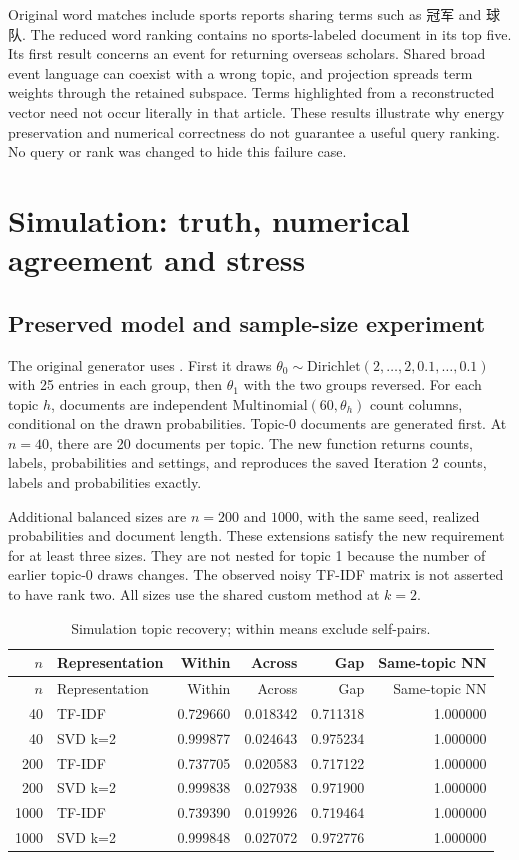 \documentclass[11pt]{article}
\renewcommand{\arraystretch}{1.15}
\begin{document}
Original word matches include sports reports sharing terms such as
冠军 and 球队. The reduced word ranking contains no sports-labeled
document in its top five. Its first result concerns an event for returning
overseas scholars. Shared broad event language can coexist with a wrong
topic, and projection spreads term weights through the retained subspace.
Terms highlighted from a reconstructed vector need not occur literally
in that article. These results illustrate why energy preservation and
numerical correctness do not guarantee a useful query ranking.
No query or rank was changed to hide this failure case.

\clearpage
\section{Simulation: truth, numerical agreement and stress}
\subsection{Preserved model and sample-size experiment}
The original generator uses . First it draws
$\theta_0\sim\mathrm{Dirichlet}(2,\ldots,2,0.1,\ldots,0.1)$ with
25 entries in each group, then $\theta_1$ with the two groups reversed.
For each topic $h$, documents are independent
$\mathrm{Multinomial}(60,\theta_h)$ count columns, conditional on
the drawn probabilities. Topic-0 documents are generated first.
At $n=40$, there are 20 documents per topic.
The new  function returns counts, labels,
probabilities and settings, and reproduces the saved Iteration 2
counts, labels and probabilities exactly.

Additional balanced sizes are $n=200$ and $1000$, with the same seed,
realized probabilities and document length. These extensions satisfy
the new requirement for at least three sizes. They are not nested for
topic 1 because the number of earlier topic-0 draws changes.
The observed noisy TF-IDF matrix is not asserted to have rank two.
All sizes use the shared custom method at $k=2$.
{\small\renewcommand{\arraystretch}{1.05}
\begin{longtable}{rlrrrr}
\caption{Simulation topic recovery; within means exclude self-pairs.}\\
\toprule
$n$ & Representation & Within & Across & Gap & Same-topic NN \\ \midrule\endfirsthead
\toprule
$n$ & Representation & Within & Across & Gap & Same-topic NN \\ \midrule\endhead
40 & TF-IDF & 0.729660 & 0.018342 & 0.711318 & 1.000000 \\
40 & SVD k=2 & 0.999877 & 0.024643 & 0.975234 & 1.000000 \\
200 & TF-IDF & 0.737705 & 0.020583 & 0.717122 & 1.000000 \\
200 & SVD k=2 & 0.999838 & 0.027938 & 0.971900 & 1.000000 \\
1000 & TF-IDF & 0.739390 & 0.019926 & 0.719464 & 1.000000 \\
1000 & SVD k=2 & 0.999848 & 0.027072 & 0.972776 & 1.000000 \\
\bottomrule
\end{longtable}
}
\end{document}
